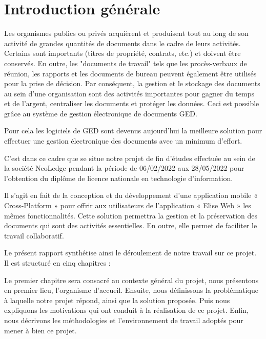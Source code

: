 
\chapter*{Introduction générale}
\label{chap:introduction}


Les organismes publics ou privés acquièrent et produisent tout au long de son activité de grandes quantités de documents dans le cadre de leurs activités. Certains sont importants (titres de propriété, contrats, etc.) et doivent être conservés. En outre, les "documents de travail" tels que les procès-verbaux de réunion, les rapports et les documents de bureau peuvent également être utilisés pour la prise de décision. Par conséquent, la gestion et le stockage des documents au sein d'une organisation sont des activités importantes pour gagner du temps et de l'argent, centraliser les documents et protéger les données. Ceci est possible grâce au système de gestion électronique de documents GED. 

\medskip

Pour cela les logiciels de GED sont devenus aujourd'hui la meilleure solution pour effectuer une gestion électronique des documents avec un minimum d'effort.
\medskip

C'est dans ce cadre que se situe notre projet de fin d'études effectuée au sein de la société NeoLedge pendant la période de 06/02/2022 aux 28/05/2022 pour l'obtention du diplôme de licence nationale en technologie d'information.
\medskip

Il s'agit en fait de la conception et du développement d'une application mobile « Cross-Platform » pour offrir aux utilisateurs de l'application « Elise Web » les mêmes fonctionnalités. Cette solution permettra la gestion et la préservation des documents qui sont des activités essentielles. En outre, elle permet de faciliter le travail collaboratif.

\medskip
Le présent rapport synthétise ainsi le déroulement de notre travail sur ce projet. Il est structuré en cinq chapitres :

\medskip
 Le premier chapitre sera consacré au contexte général du projet,  nous présentons en premier lieu, l'organisme d'accueil. Ensuite, nous définissons la problématique à laquelle notre projet répond, ainsi que la solution proposée. Puis nous expliquons les motivations qui ont conduit à la réalisation de ce projet. Enfin, nous décrivons les méthodologies et l'environnement de travail adoptés pour mener à bien ce projet.


